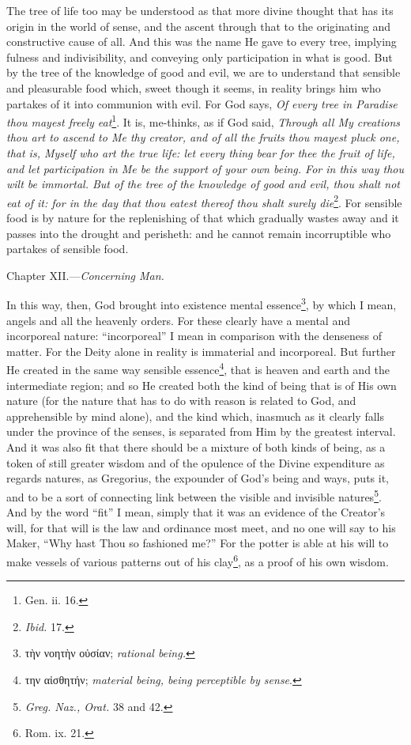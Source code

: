 The tree of life too may be understood as that more divine thought that has its origin in the world of sense, and the ascent through that to the originating and constructive cause of all. And this was the name He gave to every tree, implying fulness and indivisibility, and conveying only participation in what is good. But by the tree of the knowledge of good and evil, we are to understand that sensible and pleasurable food which, sweet though it seems, in reality brings him who partakes of it into communion with evil. For God says, \emph{Of every tree in Paradise thou mayest freely eat}\footnote{Gen. ii. 16.}. It is, me-thinks, as if God said, \emph{Through all My creations thou art to ascend to Me thy creator, and of all the fruits thou mayest pluck one, that is, Myself who art the true life: let every thing bear for thee the fruit of life, and let participation in Me be the support of your own being. For in this way thou wilt be immortal. But of the tree of the knowledge of good and evil, thou shalt not eat of it: for in the day that thou eatest thereof thou shalt surely die}\footnote{\emph{Ibid.} 17.}. For sensible food is by nature for the replenishing of that which gradually wastes away and it passes into the drought and perisheth: and he cannot remain incorruptible who partakes of sensible food.


Chapter XII.—\emph{Concerning Man.}

In this way, then, God brought into existence mental essence\footnote{\textgreek{τὴν νοητὴν οὐσίαν;} \emph{rational being.}}, by which I mean, angels and all the heavenly orders. For these clearly have a mental and incorporeal nature: “incorporeal” I mean in comparison with the denseness of matter. For the Deity alone in reality is immaterial and incorporeal. But further He created in the same way sensible essence\footnote{\textgreek{την αἰσθητήν}; \emph{material being, being perceptible by sense}.}, that is heaven and earth and the intermediate region; and so He created both the kind of being that is of His own nature (for the nature that has to do with reason is related to God, and apprehensible by mind alone), and the kind which, inasmuch as it clearly falls under the province of the senses, is separated from Him by the greatest interval. And it was also fit that there should be a mixture of both kinds of being, as a token of still greater wisdom and of the opulence of the Divine expenditure as regards natures, as Gregorius, the expounder of God’s being and ways, puts it, and to be a sort of connecting link between the visible and invisible natures\footnote{\emph{Greg. Naz., Orat. }38 and 42.}. And by the word “fit” I mean, simply that it was an evidence of the Creator’s will, for that will is the law and ordinance most meet, and no one will say to his Maker, “Why hast Thou so fashioned me?” For the potter is able at his will to make vessels of various patterns out of his clay\footnote{Rom. ix. 21.}, as a proof of his own wisdom.

